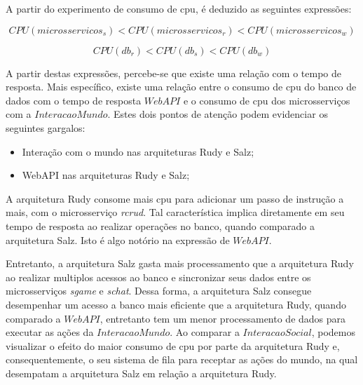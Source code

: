 A partir do experimento de consumo de \ac{cpu}, é deduzido as seguintes expressões:

$$
    CPU(microsservicos_{s}) < CPU(microsservicos_{r}) < CPU(microsservicos_{w})
$$

$$
    CPU(db_{r}) < CPU(db_{s}) < CPU(db_{w})
$$

A partir destas expressões, percebe-se que existe uma relação com o tempo de resposta.
%
Mais específico, existe uma relação entre o consumo de \ac{cpu} do banco de dados com o tempo de resposta $WebAPI$ e o consumo de \ac{cpu} dos microsserviços com a $InteracaoMundo$.
%
Estes dois pontos de atenção podem evidenciar os seguintes gargalos:

\begin{itemize}
 \item Interação com o mundo nas arquiteturas Rudy e Salz;
 \item WebAPI nas arquiteturas Rudy e Salz;
\end{itemize}
 
A arquitetura Rudy consome mais \ac{cpu} para adicionar um passo de instrução a mais, com o microsserviço \textit{rcrud}.
%
Tal característica implica diretamente em seu tempo de resposta ao realizar operações no banco, quando comparado a arquitetura Salz.
%
Isto é algo notório na expressão de $WebAPI$.

Entretanto, a arquitetura Salz gasta mais processamento que a arquitetura Rudy ao realizar multiplos acessos ao banco e sincronizar seus dados entre os microsserviços \textit{sgame} e \textit{schat}.
%
Dessa forma, a arquitetura Salz consegue desempenhar um acesso a banco mais eficiente que a arquitetura Rudy, quando comparado a $WebAPI$, entretanto tem um menor processamento de dados para executar as ações da $InteracaoMundo$.
%
Ao comparar a $InteracaoSocial$, podemos visualizar o efeito do maior consumo de \ac{cpu} por parte da arquitetura Rudy e, consequentemente, o seu sistema de fila para receptar as ações do mundo, na qual desempatam a arquitetura Salz em relação a arquitetura Rudy.

